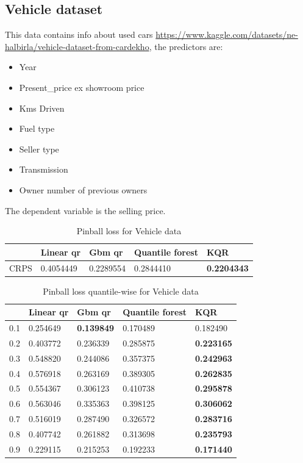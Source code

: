 \subsection{Vehicle dataset}
This data contains info about used cars \href{https://www.kaggle.com/datasets/nehalbirla/vehicle-dataset-from-cardekho}{https://www.kaggle.com/datasets/ne-halbirla/vehicle-dataset-from-cardekho}, the predictors are:
\begin{itemize}
    \item Year
    \item Present\_price ex showroom price
    \item Kms Driven
    \item Fuel type
    \item Seller type
    \item Transmission
    \item Owner number of previous owners
\end{itemize}
The dependent variable is the selling price.

\begin{table}
\caption{Pinball loss for Vehicle data}
\begin{tabular}{lllll}
    \toprule
     & Linear qr & Gbm qr & Quantile forest & KQR \\
    \midrule
    CRPS & 0.4054449 & 0.2289554 & 0.2844410 & \textbf{0.2204343} \\
    \bottomrule
    \end{tabular}
\end{table}

\begin{table}
    \caption{Pinball loss quantile-wise for Vehicle data}
    \begin{tabular}{lllll}
    \toprule
     & Linear qr & Gbm qr & Quantile forest & KQR \\
    \midrule
    0.1 & 0.254649 & \textbf{0.139849} & 0.170489 & 0.182490 \\
    0.2 & 0.403772 & 0.236339 & 0.285875 & \textbf{0.223165} \\
    0.3 & 0.548820 & 0.244086 & 0.357375 & \textbf{0.242963} \\
    0.4 & 0.576918 & 0.263169 & 0.389305 & \textbf{0.262835} \\
    0.5 & 0.554367 & 0.306123 & 0.410738 & \textbf{0.295878} \\
    0.6 & 0.563046 & 0.335363 & 0.398125 & \textbf{0.306062} \\
    0.7 & 0.516019 & 0.287490 & 0.326572 & \textbf{0.283716} \\
    0.8 & 0.407742 & 0.261882 & 0.313698 & \textbf{0.235793} \\
    0.9 & 0.229115 & 0.215253 & 0.192233 & \textbf{0.171440} \\
    \bottomrule
    \end{tabular}
\end{table}

